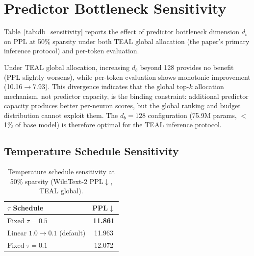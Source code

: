 \section{Predictor Bottleneck Sensitivity}
\label{app:db_sensitivity}

Table~\ref{tab:db_sensitivity} reports the effect of predictor bottleneck dimension $d_b$ on PPL at 50\% sparsity under both TEAL global allocation (the paper's primary inference protocol) and per-token evaluation.

\begin{table}[h]
\centering
\caption{Predictor bottleneck sensitivity at 50\% sparsity (WikiText-2 PPL$\downarrow$). TEAL global is the primary inference protocol; per-token shown for reference.}
\label{tab:db_sensitivity}
\end{table}

Under TEAL global allocation, increasing $d_b$ beyond 128 provides no benefit (PPL slightly worsens), while per-token evaluation shows monotonic improvement (10.16$\to$7.93).
This divergence indicates that the global top-$k$ allocation mechanism, not predictor capacity, is the binding constraint: additional predictor capacity produces better per-neuron scores, but the global ranking and budget distribution cannot exploit them.
The $d_b{=}128$ configuration (75.9M params, $<$1\% of base model) is therefore optimal for the TEAL inference protocol.

\subsection{Temperature Schedule Sensitivity}
\label{app:tau_sensitivity}

\begin{table}[h]
\centering
\caption{Temperature schedule sensitivity at 50\% sparsity (WikiText-2 PPL$\downarrow$, TEAL global).}
\label{tab:tau_sensitivity}
\small
\begin{tabular}{lc}
\toprule
$\tau$ Schedule & PPL$\downarrow$ \\
\midrule
Fixed $\tau{=}0.5$ & \textbf{11.861} \\
Linear $1.0 \to 0.1$ (default) & 11.963 \\
Fixed $\tau{=}0.1$ & 12.072 \\
\bottomrule
\end{tabular}
\end{table}

